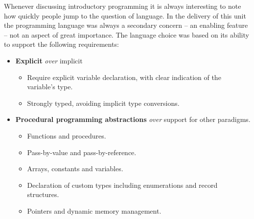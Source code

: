 Whenever discussing introductory programming it is always interesting to note how quickly people jump to the question of language. In the delivery of this unit the programming language was always a secondary concern -- an enabling feature -- not an aspect of great importance. The language choice was based on its ability to support the following requirements:
\begin{itemize}[noitemsep,nolistsep]
	\item \textbf{Explicit} \emph{over} implicit
	\begin{itemize}[noitemsep,nolistsep]
		\item Require explicit variable declaration, with clear indication of the variable's type.
		\item Strongly typed, avoiding implicit type conversions.
	\end{itemize}

	\item \textbf{Procedural programming abstractions} \emph{over} support for other paradigms.
	\begin{itemize}[noitemsep,nolistsep]
		\item Functions and procedures.
		\item Pass-by-value and pass-by-reference.
		\item Arrays, constants and variables.
		\item Declaration of custom types including enumerations and record structures.
		\item Pointers and dynamic memory management.
	\end{itemize}
\end{itemize}

